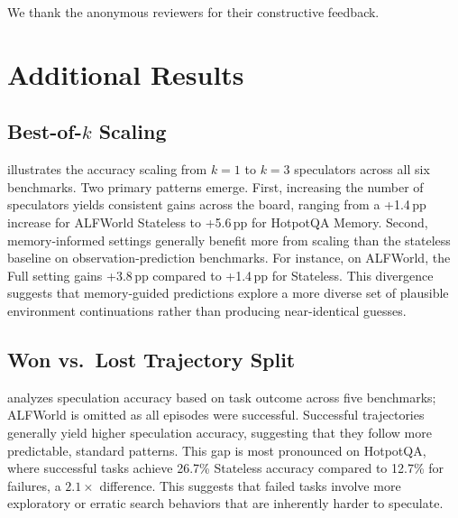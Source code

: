 \documentclass{article}
\begin{document}
\begin{ack}
We thank the anonymous reviewers for their constructive feedback.
\end{ack}






\newpage
\appendix

\section{Additional Results}
\label{app:additional}

\subsection{Best-of-$k$ Scaling}
\label{app:bestofk}



 illustrates the accuracy scaling from $k=1$ to $k=3$ speculators across all six benchmarks. Two primary patterns emerge. First, increasing the number of speculators yields consistent gains across the board, ranging from a +1.4\,pp increase for ALFWorld Stateless to +5.6\,pp for HotpotQA Memory. Second, memory-informed settings generally benefit more from scaling than the stateless baseline on observation-prediction benchmarks. For instance, on ALFWorld, the Full setting gains +3.8\,pp compared to +1.4\,pp for Stateless. This divergence suggests that memory-guided predictions explore a more diverse set of plausible environment continuations rather than producing near-identical guesses.

\subsection{Won vs.\ Lost Trajectory Split}
\label{app:wonlost}



 analyzes speculation accuracy based on task outcome across five benchmarks; ALFWorld is omitted as all episodes were successful. Successful trajectories generally yield higher speculation accuracy, suggesting that they follow more predictable, standard patterns. This gap is most pronounced on HotpotQA, where successful tasks achieve 26.7\% Stateless accuracy compared to 12.7\% for failures, a $2.1\times$ difference. This suggests that failed tasks involve more exploratory or erratic search behaviors that are inherently harder to speculate.
\end{document}
